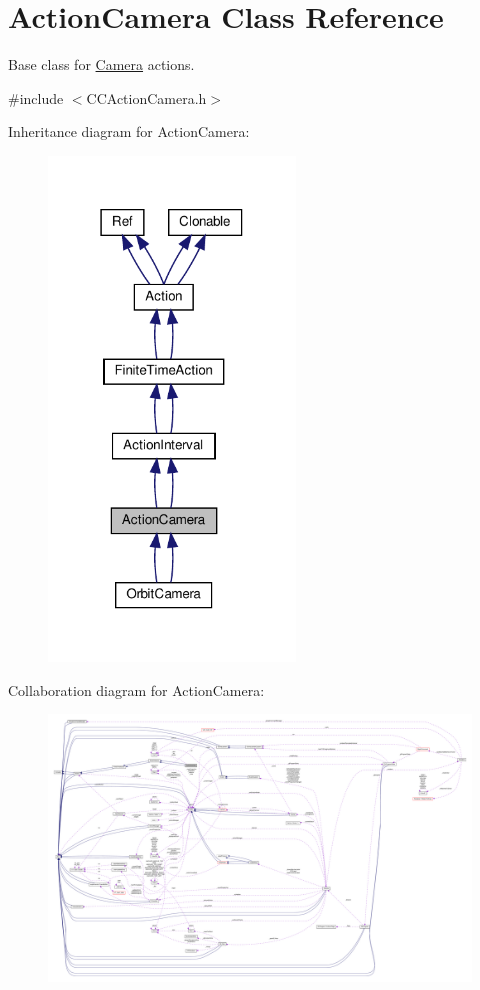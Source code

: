 \hypertarget{classActionCamera}{}\section{Action\+Camera Class Reference}
\label{classActionCamera}


Base class for \hyperlink{classCamera}{Camera} actions.  




{\ttfamily \#include $<$C\+C\+Action\+Camera.\+h$>$}



Inheritance diagram for Action\+Camera\+:
\nopagebreak
\begin{figure}[H]
\begin{center}
\leavevmode
\includegraphics[width=186pt]{classActionCamera__inherit__graph}
\end{center}
\end{figure}


Collaboration diagram for Action\+Camera\+:
\nopagebreak
\begin{figure}[H]
\begin{center}
\leavevmode
\includegraphics[width=350pt]{classActionCamera__coll__graph}
\end{center}
\end{figure}
